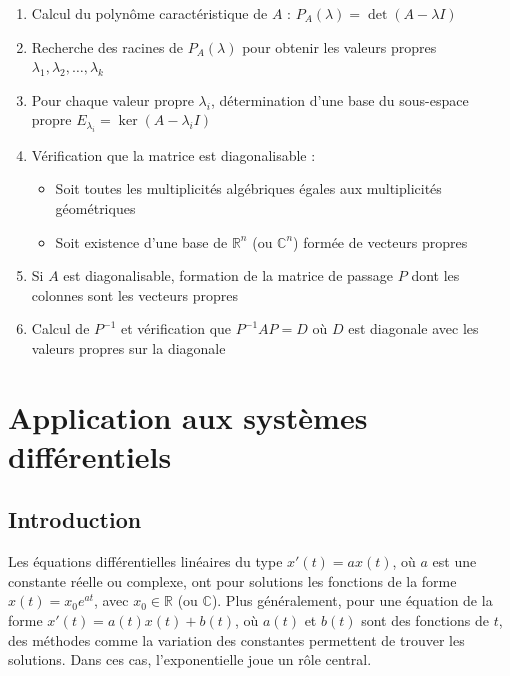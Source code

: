\begin{enumerate}
	\item Calcul du polynôme caractéristique de $A$ : $P_A(\lambda) = \det(A - \lambda I)$
	\item Recherche des racines de $P_A(\lambda)$ pour obtenir les valeurs propres $\lambda_1, \lambda_2, \ldots, \lambda_k$
	\item Pour chaque valeur propre $\lambda_i$, détermination d'une base du sous-espace propre $E_{\lambda_i} = \ker(A - \lambda_i I)$
	\item Vérification que la matrice est diagonalisable :
	\begin{itemize}
		\item Soit toutes les multiplicités algébriques égales aux multiplicités géométriques
		\item Soit existence d'une base de $\mathbb{R}^n$ (ou $\mathbb{C}^n$) formée de vecteurs propres
	\end{itemize}
	\item Si $A$ est diagonalisable, formation de la matrice de passage $P$ dont les colonnes sont les vecteurs propres
	\item Calcul de $P^{-1}$ et vérification que $P^{-1}AP = D$ où $D$ est diagonale avec les valeurs propres sur la diagonale
\end{enumerate}

\section{Application aux systèmes différentiels}


\subsection{Introduction}
Les équations différentielles linéaires du type \( x'(t) = ax(t) \), où \( a \) est une constante réelle ou complexe, ont pour solutions les fonctions de la forme \( x(t) = x_0 e^{at} \), avec \( x_0 \in \mathbb{R} \) (ou \( \mathbb{C} \)). Plus généralement, pour une équation de la forme \( x'(t) = a(t)x(t) + b(t) \), où \( a(t) \) et \( b(t) \) sont des fonctions de \( t \), des méthodes comme la variation des constantes permettent de trouver les solutions. Dans ces cas, l'exponentielle joue un rôle central.

